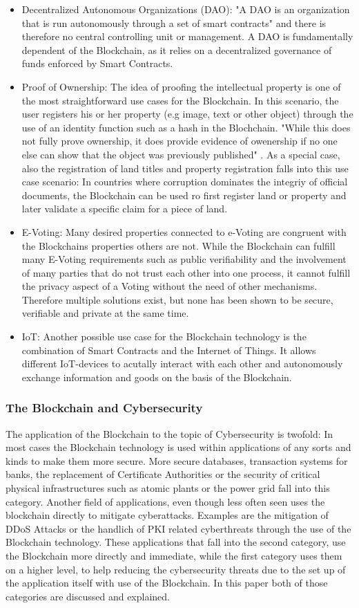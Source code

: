 \begin{itemize}
  \item Decentralized Autonomous Organizations (DAO): "A DAO is an organization that is run autonomously through a set of smart contracts" \cite{Wust2017} and there is therefore no central controlling unit or management. A DAO is fundamentally dependent of the Blockchain, as it relies on a decentralized governance of funds enforced by Smart Contracts.
  \item Proof of Ownership: The idea of proofing the intellectual property is one of the most straightforward use cases for the Blockchain. In this scenario, the user registers his or her property (e.g image, text or other object) through the use of an identity function such as a hash in the Blochchain. "While this does not fully prove ownership, it does provide evidence of owenership if no one else can show that the object was previously published" \cite{Wust2017}. As a special case, also the registration of land titles and property registration falls into this use case scenario: In countries where corruption dominates the integriy of official documents, the Blockchain can be used ro first register land or property and later validate a specific claim for a piece of land.
  \item E-Voting: Many desired properties connected to e-Voting are congruent with the Blockchains properties others are not. While the Blockchain can fulfill many E-Voting requirements such as public verifiability and the involvement of many parties that do not trust each other into one process, it cannot fulfill the privacy aspect of a Voting without the need of other mechanisms. Therefore multiple solutions exist, but none has been shown to be secure, verifiable and private at the same time.
  \item IoT: Another possible use case for the Blockchain technology is the combination of Smart Contracts and the Internet of Things. It allows different IoT-devices to acutally interact with each other and autonomously exchange information and goods on the basis of the Blockchain.
\end{itemize}
\subsubsection{The Blockchain and Cybersecurity}
The application of the Blockchain to the topic of Cybersecurity is twofold: In most cases the Blockchain technology is used within applications of any sorts and kinds to make them more secure. More secure databases, transaction systems for banks, the replacement of Certificate Authorities or the security of critical physical infrastructures such as atomic plants or the power grid fall into this category. Another field of applications, even though less often seen uses the blockchain directly to mitigate cyberattacks. Examples are the mitigation of DDoS Attacks or the handlich of PKI related cyberthreats through the use of the Blockchain technology. These applications that fall into the second category, use the Blockchain more directly and immediate, while the first category uses them on a higher level, to help reducing the cybersecurity threats due to the set up of the application itself with use of the Blockchain.
In this paper both of those categories are discussed and explained.   